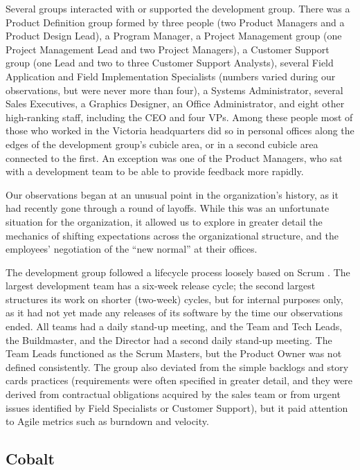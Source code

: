 \documentclass[10pt, conference, compsocconf]{IEEEtran}
\begin{document}
Several groups interacted with or supported the development group. There was a Product Definition group formed by three people (two Product Managers and a Product Design Lead), a Program Manager, a Project Management group (one Project Management Lead and two Project Managers), a Customer Support group (one Lead and two to three Customer Support Analysts), several Field Application and Field Implementation Specialists (numbers varied during our observations, but were never more than four), a Systems Administrator, several Sales Executives, a Graphics Designer, an Office Administrator, and eight other high-ranking staff, including the CEO and four VPs. Among these people most of those who worked in the Victoria headquarters did so in personal offices along the edges of the development group's cubicle area, or in a second cubicle area connected to the first. An exception was one of the Product Managers, who sat with a development team to be able to provide feedback more rapidly.

Our observations began at an unusual point in the organization's history, as it had recently gone through a round of layoffs. While this was an unfortunate situation for the organization, it allowed us to explore in greater detail the mechanics of shifting expectations across the organizational structure, and the employees' negotiation of the ``new normal'' at their offices.

The development group followed a lifecycle process loosely based on Scrum \cite{Schwaber2001}. The largest development team has a six-week release cycle; the second largest structures its work on shorter (two-week) cycles, but for internal purposes only, as it had not yet made any releases of its software by the time our observations ended. All teams had a daily stand-up meeting, and the Team and Tech Leads, the Buildmaster, and the Director had a second daily stand-up meeting. The Team Leads functioned as the Scrum Masters, but the Product Owner was not defined consistently. The group also deviated from the simple backlogs and story cards practices (requirements were often specified in greater detail, and they were derived from contractual obligations acquired by the sales team or from urgent issues identified by Field Specialists or Customer Support), but it paid attention to Agile metrics such as burndown and velocity.



\subsection{Cobalt}
\end{document}

